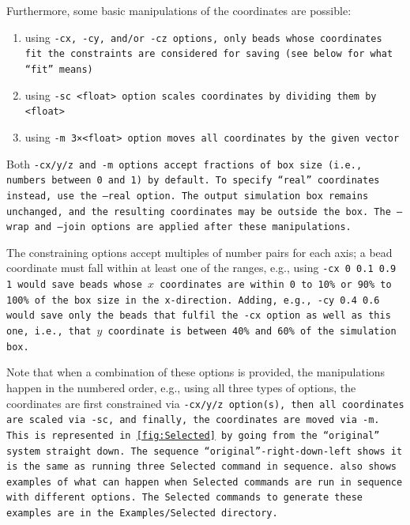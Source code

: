 Furthermore, some basic manipulations of the coordinates are possible:
\begin{enumerate}
  \item using \tt{-cx}, \tt{-cy}, and/or \tt{-cz} options, only beads whose
    coordinates fit the constraints are considered for saving (see below for
    what \enquote{fit} means)
  \item using \tt{-sc <float>} option scales coordinates by dividing them by
    \tt{<float>}
  \item using \tt{-m 3×<float>} option moves all coordinates by the given vector
\end{enumerate}

Both \tt{-cx/y/z} and \tt{-m} options accept fractions of box size (i.e.,
numbers between 0 and 1) by default. To specify \enquote{real} coordinates
instead, use the \tt{--real} option. The output simulation box remains
unchanged, and the resulting coordinates may be outside the box. The \tt{--wrap}
and \tt{--join} options are applied after these manipulations.

The constraining options accept multiples of number pairs for each axis; a bead
coordinate must fall within at least one of the ranges, e.g., using \tt{-cx 0
0.1 0.9 1} would save beads whose $x$ coordinates are within 0 to 10\% or 90\%
to 100\% of the box size in the x-direction. Adding, e.g., \tt{-cy 0.4 0.6}
would save only the beads that fulfil the \tt{-cx} option as well as this one,
i.e., that $y$ coordinate is between 40\% and 60\% of the simulation box.

Note that when a combination of these options is provided, the manipulations
happen in the numbered order, e.g., using all three types of options,
the coordinates are first constrained via \tt{-cx/y/z} option(s), then all
coordinates are scaled via \tt{-sc}, and finally, the coordinates are moved
via \tt{-m}. This is represented in \cref{fig:Selected} by going from the
\enquote{original} system straight down. The sequence
\enquote{original}-right-down-left shows it is the same as running three
\tt{Selected} command in sequence.  also shows examples of
what can happen when \tt{Selected} commands are run in sequence with different
options. The \tt{Selected} commands to generate these examples are in the
\tt{Examples/Selected} directory.

